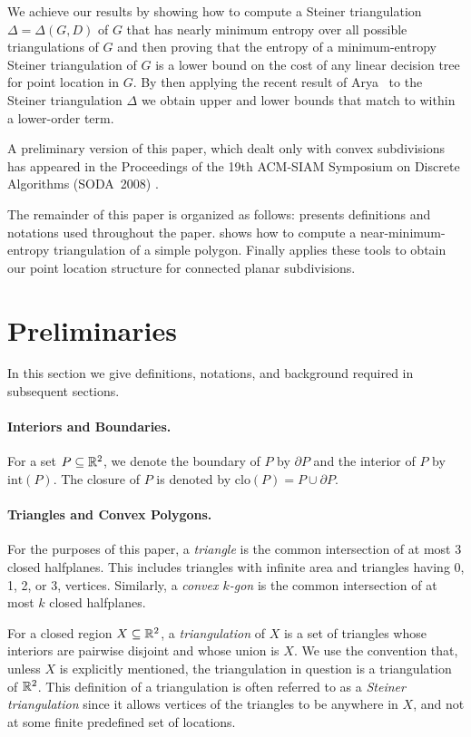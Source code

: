 \documentclass[lotsofwhite]{patmorin}
\newcommand{\boundary}{\partial}
\newcommand{\closure}{\mathrm{clo}}
\newcommand{\interior}{\mathrm{int}}
\begin{document}
We achieve our results by showing how to compute a Steiner
triangulation $\Delta=\Delta(G,D)$ of $G$ that has nearly minimum
entropy over all possible triangulations of $G$ and then proving that
the entropy of a minimum-entropy Steiner triangulation of $G$ is a
lower bound on the cost of any linear decision tree for point location
in $G$.  By then applying the recent result of Arya \etal\ to the
Steiner triangulation $\Delta$ we obtain upper and lower bounds that
match to within a lower-order term.


A preliminary version of this paper, which dealt only with convex
subdivisions has appeared in the Proceedings of the 19th ACM-SIAM
Symposium on Discrete Algorithms (SODA~2008) \cite{cdilm08}.

The remainder of this paper is organized as follows:  
presents definitions and notations used throughout the paper.
 shows how to compute a near-minimum-entropy
triangulation of a simple polygon.  Finally 
applies these tools to obtain our point location structure for
connected planar subdivisions.


\section{Preliminaries}

In this section we give definitions, notations, and background
required in subsequent sections.

\paragraph{Interiors and Boundaries.}
For a set $P\subseteq \mathbb{R}^2$, we denote the boundary of $P$ by $\boundary P$
and the interior of $P$ by $\interior(P)$.  The closure of $P$
is denoted by $\closure(P) = P\cup{\boundary P}$.


\paragraph{Triangles and Convex Polygons.}  For the purposes of this
paper, a \emph{triangle} is the common intersection of at most 3
closed halfplanes.  This includes triangles with infinite area and
triangles having 0, 1, 2, or 3, vertices. Similarly, a \emph{convex
$k$-gon} is the common intersection of at most $k$ closed halfplanes.

For a closed region $X\subseteq \mathbb{R}^2$, a \emph{triangulation} of $X$
is a set of triangles whose interiors are pairwise disjoint and whose
union is $X$.  We use the convention that, unless $X$ is explicitly
mentioned, the triangulation in question is a triangulation of $\mathbb{R}^2$.
This definition of a triangulation is often referred to as a
\emph{Steiner triangulation} since it allows vertices of the triangles
to be anywhere in $X$, and not at some finite predefined set of
locations.
\end{document}
